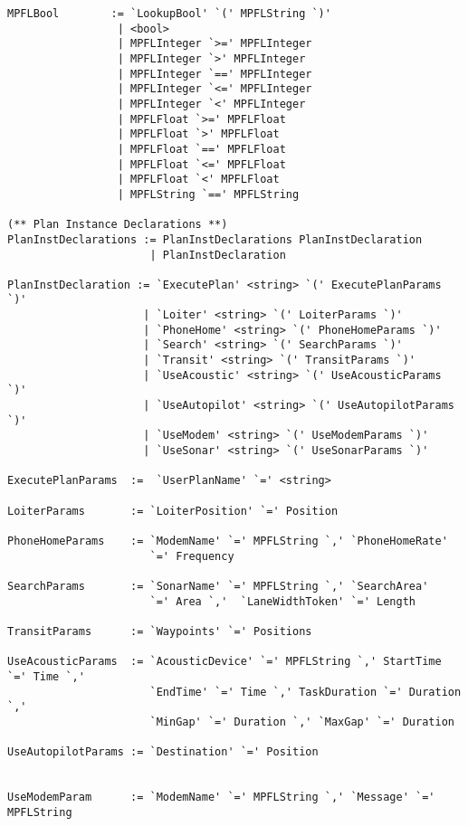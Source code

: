 \begin{verbatim}
MPFLBool        := `LookupBool' `(' MPFLString `)' 
                 | <bool>
                 | MPFLInteger `>=' MPFLInteger
                 | MPFLInteger `>' MPFLInteger
                 | MPFLInteger `==' MPFLInteger
                 | MPFLInteger `<=' MPFLInteger
                 | MPFLInteger `<' MPFLInteger
                 | MPFLFloat `>=' MPFLFloat
                 | MPFLFloat `>' MPFLFloat
                 | MPFLFloat `==' MPFLFloat
                 | MPFLFloat `<=' MPFLFloat
                 | MPFLFloat `<' MPFLFloat
                 | MPFLString `==' MPFLString
                 
(** Plan Instance Declarations **)
PlanInstDeclarations := PlanInstDeclarations PlanInstDeclaration
                      | PlanInstDeclaration

PlanInstDeclaration := `ExecutePlan' <string> `(' ExecutePlanParams `)'
                     | `Loiter' <string> `(' LoiterParams `)'
                     | `PhoneHome' <string> `(' PhoneHomeParams `)'
                     | `Search' <string> `(' SearchParams `)'
                     | `Transit' <string> `(' TransitParams `)'
                     | `UseAcoustic' <string> `(' UseAcousticParams `)'
                     | `UseAutopilot' <string> `(' UseAutopilotParams `)'
                     | `UseModem' <string> `(' UseModemParams `)'
                     | `UseSonar' <string> `(' UseSonarParams `)'                                          
                     
ExecutePlanParams  :=  `UserPlanName' `=' <string>

LoiterParams       := `LoiterPosition' `=' Position
 
PhoneHomeParams    := `ModemName' `=' MPFLString `,' `PhoneHomeRate' 
                      `=' Frequency
 
SearchParams       := `SonarName' `=' MPFLString `,' `SearchArea'  
                      `=' Area `,'  `LaneWidthToken' `=' Length

TransitParams      := `Waypoints' `=' Positions

UseAcousticParams  := `AcousticDevice' `=' MPFLString `,' StartTime `=' Time `,'
                      `EndTime' `=' Time `,' TaskDuration `=' Duration `,'
                      `MinGap' `=' Duration `,' `MaxGap' `=' Duration

UseAutopilotParams := `Destination' `=' Position


UseModemParam      := `ModemName' `=' MPFLString `,' `Message' `=' MPFLString


\end{verbatim}
